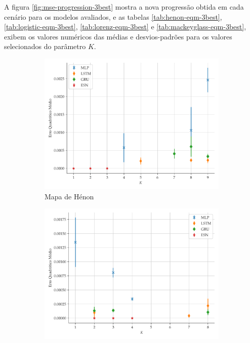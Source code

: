 \documentclass[a4paper, 12pt]{article}
\begin{document}
A figura \ref{fig:mse-progression-3best} mostra a nova progressão obtida em cada cenário para os modelos avaliados, e as tabelas \ref{tab:henon-eqm-3best}, \ref{tab:logistic-eqm-3best}, \ref{tab:lorenz-eqm-3best} e \ref{tab:mackeyglass-eqm-3best}, exibem os valores numéricos das médias e desvios-padrões para os valores selecionados do parâmetro $K$.
\begin{figure}[!ht]
     \begin{subfigure}[t]{0.45\textwidth} 
         \includegraphics[scale=0.4]{henon-3best.pdf}
         \caption{Mapa de Hénon}
     \end{subfigure}
     \centering
     \begin{subfigure}[t]{0.45\textwidth} 
         \includegraphics[scale=0.4]{logistic-3best.pdf}

\end{subfigure}
\end{figure}
\end{document}
